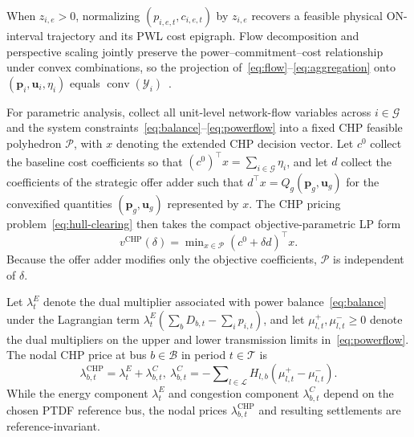 \documentclass[journal]{IEEEtran}
\DeclareMathOperator{\conv}{conv}
\newcommand{\bp}{\bm p}
\newcommand{\bu}{\bm u}
\newcommand{\CHP}{\mathrm{CHP}}
\begin{document}
When $z_{i,e}>0$, normalizing $(p_{i,e,t},c_{i,e,t})$ by $z_{i,e}$ recovers a feasible physical ON-interval trajectory and its PWL cost epigraph. Flow decomposition and perspective scaling jointly preserve the power--commitment--cost relationship under convex combinations, so the projection of~\eqref{eq:flow}--\eqref{eq:aggregation} onto $(\bp_i,\bu_i,\eta_i)$ equals $\conv(\mathcal{Y}_i)$~\cite{pan2018,networkflow}.

For parametric analysis, collect all unit-level network-flow variables across $i\in\mathcal{G}$ and the system constraints~\eqref{eq:balance}--\eqref{eq:powerflow} into a fixed CHP feasible polyhedron $\mathcal{P}$, with $x$ denoting the extended CHP decision vector. Let $c^0$ collect the baseline cost coefficients so that $(c^0)^\top x=\sum\nolimits_{i\in\mathcal{G}}\eta_i$, and let $d$ collect the coefficients of the strategic offer adder such that $d^\top x=Q_g(\bp_g,\bu_g)$ for the convexified quantities $(\bp_g,\bu_g)$ represented by $x$. The CHP pricing problem~\eqref{eq:hull-clearing} then takes the compact objective-parametric LP form
\begin{equation}
v^{\CHP}(\delta) = \min\nolimits_{x\in\mathcal{P}} (c^0 + \delta d)^\top x.\label{eq:paramlp}
\end{equation}
Because the offer adder modifies only the objective coefficients, $\mathcal{P}$ is independent of $\delta$.

Let $\lambda_t^E$ denote the dual multiplier associated with power balance~\eqref{eq:balance} under the Lagrangian term $\lambda_t^E(\sum_b D_{b,t}-\sum_i p_{i,t})$, and let $\mu_{l,t}^{+},\mu_{l,t}^{-}\ge 0$ denote the dual multipliers on the upper and lower transmission limits in~\eqref{eq:powerflow}. The nodal CHP price at bus $b\in\mathcal{B}$ in period $t\in\mathcal{T}$ is
\begin{equation}
\lambda_{b,t}^{\CHP} = \lambda_t^E + \lambda_{b,t}^C, \
\lambda_{b,t}^C = -\sum\nolimits_{l\in\mathcal{L}} H_{l,b}\!\left(\mu_{l,t}^{+}-\mu_{l,t}^{-}\right).\label{eq:lmp}
\end{equation}
While the energy component $\lambda_t^E$ and congestion component $\lambda_{b,t}^C$ depend on the chosen PTDF reference bus, the nodal prices $\lambda_{b,t}^{\CHP}$ and resulting settlements are reference-invariant.


\end{document}
